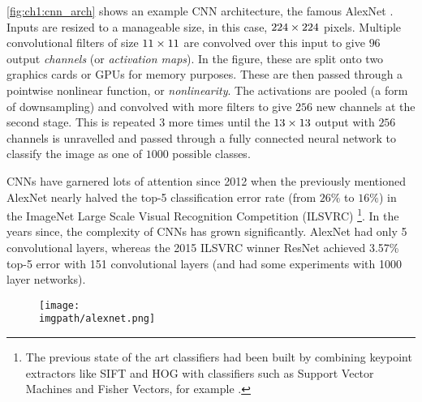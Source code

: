 \autoref{fig:ch1:cnn_arch} shows an example CNN
architecture, the famous AlexNet \cite{krizhevsky_imagenet_2012}. Inputs are resized to a
manageable size, in this case, $224\times 224$ pixels. Multiple convolutional
filters of size $11\times 11$ are convolved over this input to give $96$ output
\emph{channels} (or \emph{activation maps}). In the figure, these are split onto two
graphics cards or GPUs for memory purposes. These are then passed through a
pointwise nonlinear function, or \emph{nonlinearity}.
The activations are pooled (a form of downsampling) and convolved with more
filters to give $256$ new channels at the second stage. This is repeated 3 more
times until the $13\times 13$ output with $256$ channels is unravelled and passed
through a fully connected neural network to classify the image as one of $1000$
possible classes.

CNNs have garnered lots of attention since 2012 when the previously mentioned AlexNet
nearly halved the top-5 classification error rate (from $26\%$ to $16\%$)
in the ImageNet Large Scale Visual Recognition Competition (ILSVRC)
\cite{russakovsky_imagenet_2015}\footnote{The previous state of
the art classifiers had been built by combining keypoint extractors like
SIFT\cite{lowe_distinctive_2004} and HOG\cite{dalal_histograms_2005} with
classifiers such as Support Vector Machines\cite{cortes_support-vector_1995} and
Fisher Vectors\cite{sanchez_image_2013}, for example \cite{sanchez_high-dimensional_2011}.}.
In the years since, the complexity of CNNs has grown significantly. AlexNet had
only 5 convolutional layers, whereas the 2015 ILSVRC winner ResNet \cite{he_deep_2016}
achieved 3.57\% top-5 error with 151 convolutional layers (and had some
experiments with 1000 layer networks).

\begin{figure}
  \centering
    \texttt{[image: \\imgpath/alexnet.png]}
    \label{fig:ch1:cnn_arch}
  \end{figure}

